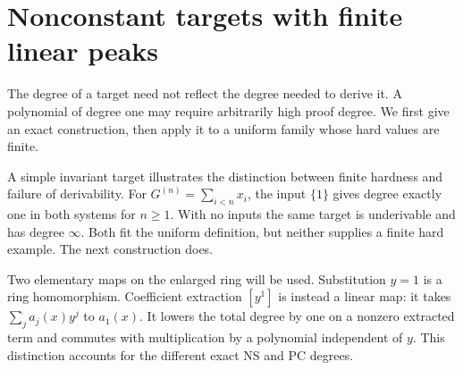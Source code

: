 \section{Nonconstant targets with finite linear peaks}\label{sec:target-examples}
The degree of a target need not reflect the degree needed to derive it.
A polynomial of degree one may require arbitrarily high proof degree.
We first give an exact construction, then apply it to a uniform family
whose hard values are finite.

A simple invariant target illustrates the distinction between finite
hardness and failure of derivability. For $G^{(n)}=\sum_{i<n}x_i$, the input
$\{1\}$ gives degree exactly one in both systems for $n\ge1$. With no
inputs the same target is underivable and has degree $\infty$. Both
fit the uniform definition, but neither supplies a finite hard example.
The next construction does.

Two elementary maps on the enlarged ring will be used. Substitution
$y=1$ is a ring homomorphism. Coefficient extraction $[y^1]$ is instead
a linear map: it takes $\sum_j a_j(x)y^j$ to $a_1(x)$.
It lowers the total degree by one on a nonzero extracted term and
commutes with multiplication by a polynomial independent of $y$.
This distinction accounts for the different exact NS and PC degrees.

